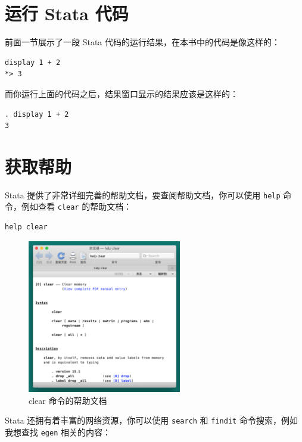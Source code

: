 \documentclass[]{ctexbook}
\begin{document}
\hypertarget{stata-}{%
\section{运行 Stata 代码}\label{stata-}}

前面一节展示了一段 Stata 代码的运行结果，在本书中的代码是像这样的：

\begin{lstlisting}
display 1 + 2
*> 3
\end{lstlisting}

而你运行上面的代码之后，结果窗口显示的结果应该是这样的：

\begin{lstlisting}
. display 1 + 2
3
\end{lstlisting}

\hypertarget{section-10}{%
\section{获取帮助}\label{section-10}}

Stata 提供了非常详细完善的帮助文档，要查阅帮助文档，你可以使用 \texttt{help} 命令，例如查看 \texttt{clear} 的帮助文档：

\begin{lstlisting}
help clear
\end{lstlisting}

\begin{figure}

{\centering \includegraphics[width=0.6\textwidth]{assets/clear} 

}

\caption{clear 命令的帮助文档}\label{fig:clear}
\end{figure}

Stata 还拥有着丰富的网络资源，你可以使用 \texttt{search} 和 \texttt{findit} 命令搜索，例如我想查找 \texttt{egen} 相关的内容：
\end{document}
